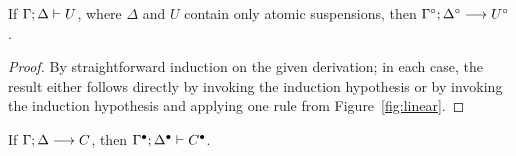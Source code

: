 \bigskip
\begin{theorem}
If ${\Gamma};{\Delta} \vdash {U} \mathstrut$, where $\Delta$ and $U$ contain only
atomic suspensions, then ${\Gamma^\circ};{\Delta^\circ} \longrightarrow {U^\circ} \mathstrut$.
\end{theorem}

\begin{proof}
  By straightforward induction on the given derivation; in each case,
  the result either follows directly by invoking the induction
  hypothesis or by invoking the induction hypothesis and applying one
  rule from Figure~\ref{fig:linear}.
\end{proof}

\begin{theorem}
If ${\Gamma};{\Delta} \longrightarrow {C} \mathstrut$,
then ${\Gamma^\bullet};{\Delta^\bullet} \vdash {C^\bullet} \mathstrut$. 
\end{theorem}

